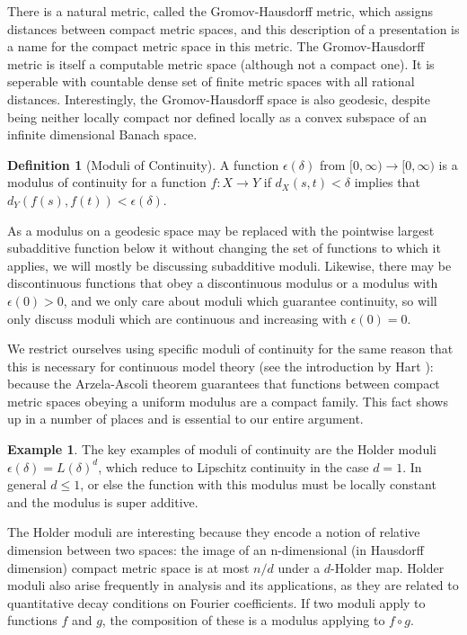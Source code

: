 \documentclass{journal}
\theoremstyle{definition}
\newtheorem{dfn}[thm]{Definition}
\newtheorem{example}[thm]{Example}
\begin{document}
There is a natural metric, called the Gromov-Hausdorff metric, which assigns distances between compact metric spaces, and this description of a presentation is a name for the compact metric space in this metric. The Gromov-Hausdorff metric is itself a computable metric space (although not a compact one). It is seperable with countable dense set of finite metric spaces with all rational distances. Interestingly, the Gromov-Hausdorff space is also geodesic, despite being neither locally compact nor defined locally as a convex subspace of an infinite dimensional Banach space.

\begin{dfn}[Moduli of Continuity]
A function $\epsilon(\delta)$ from $[0,\infty)\rightarrow [0,\infty)$ is a modulus of continuity for a function $f:X\rightarrow Y$ if $d_X(s,t)<\delta$ implies that $d_Y(f(s),f(t))<\epsilon(\delta)$. 
\end{dfn}
\label{dfn:moduli}
As a modulus on a geodesic space may be replaced with the pointwise largest subadditive function below it without changing the set of functions to which it applies, we will mostly be discussing subadditive moduli. Likewise, there may be discontinuous functions that obey a discontinuous modulus or a modulus with $\epsilon(0) > 0$, and we only care about moduli which guarantee continuity, so will only discuss moduli which are continuous and increasing with $\epsilon(0) = 0$.

We restrict ourselves using specific moduli of continuity for the same reason that this is necessary for continuous model theory (see the introduction by Hart \cite{hartcontinuous}): because the Arzela-Ascoli theorem guarantees that functions between compact metric spaces obeying a uniform modulus are a compact family. This fact shows up in a number of places and is essential to our entire argument.

\begin{example}
    The key examples of moduli of continuity are the Holder moduli $\epsilon(\delta) = L (\delta)^d$, which reduce to Lipschitz continuity in the case $d = 1$. In general $d\leq 1$, or else the function with this modulus must be locally constant and the modulus is super additive. 
\end{example}
\label{example:holder}

The Holder moduli are interesting because they encode a notion of relative dimension between two spaces: the image of an n-dimensional (in Hausdorff dimension) compact metric space is at most $n/d$ under a $d$-Holder map. Holder moduli also arise frequently in analysis and its applications, as they are related to quantitative decay conditions on Fourier coefficients. If two moduli apply to functions $f$ and $g$, the composition of these is a modulus applying to $f\circ g$.
\end{document}
